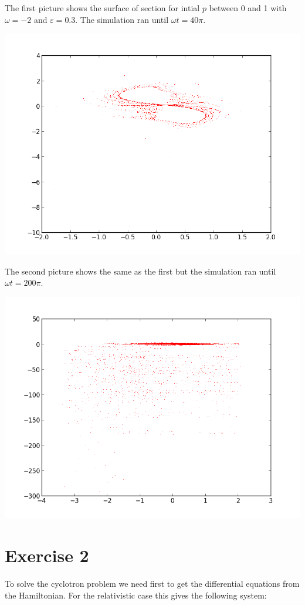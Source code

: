 \documentclass[%
]
{scrartcl}
\theoremstyle{plain}
\begin{document}


The first picture shows the surface of section for intial $p$ between 0 and 1 with $\omega = -2$ and $\varepsilon = 0.3$. The simulation ran until $\omega t=40\pi$.

\begin{center}
\centering
\includegraphics[width=0.6\linewidth]{../drivenPendulumLeapfrog.png}
\end{center}

The second picture shows the same as the first but the simulation ran until $\omega t=200\pi$.

\begin{center}
\centering
\includegraphics[width=0.6\linewidth]{../drivenPendulumLeapfrog2.png}
\end{center}

\section*{Exercise 2}

To solve the cyclotron problem we need first to get the differential equations from the Hamiltonian. For the relativistic case this gives the following system:
\end{document}
